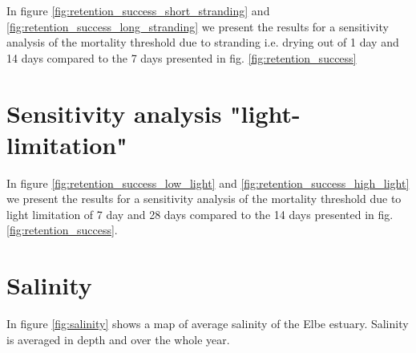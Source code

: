 \documentclass[npg, manuscript]{copernicus}
\begin{document}

In figure \ref{fig:retention_success_short_stranding} and \ref{fig:retention_success_long_stranding} we present the results for a sensitivity analysis of the mortality threshold due to stranding i.e. drying out of 1 day and 14 days compared to the 7 days presented in fig. \ref{fig:retention_success}


\section{Sensitivity analysis "light-limitation"}
\label{sec:light-limitation}


In figure \ref{fig:retention_success_low_light} and \ref{fig:retention_success_high_light} we present the results for a sensitivity analysis of the mortality threshold due to light limitation of 7 day and 28 days compared to the 14 days presented in fig. \ref{fig:retention_success}.

\section{Salinity}
\label{sec:salinity}


In figure \ref{fig:salinity} shows a map of average salinity of the Elbe estuary. Salinity is averaged in depth and over the whole year.


\noappendix       %



\end{document}
